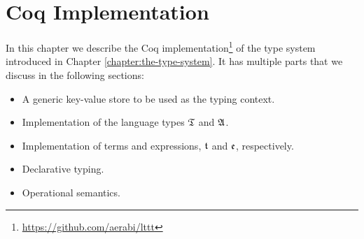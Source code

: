 \chapter{Coq Implementation}\label{chap:coq-implementation}

In this chapter we describe the Coq implementation\footnote{\url{https://github.com/aerabi/lttt}} of the type system introduced in Chapter \ref{chapter:the-type-system}. It has multiple parts that we discuss in the following sections:
\begin{itemize}
    \item A generic key-value store to be used as the typing context.
    \item Implementation of the language types $\mathfrak{T}$ and $\mathfrak{A}$.
    \item Implementation of terms and expressions, $\mathfrak{t}$ and $\mathfrak{e}$, respectively.
    \item Declarative typing.
    \item Operational semantics.
\end{itemize}




